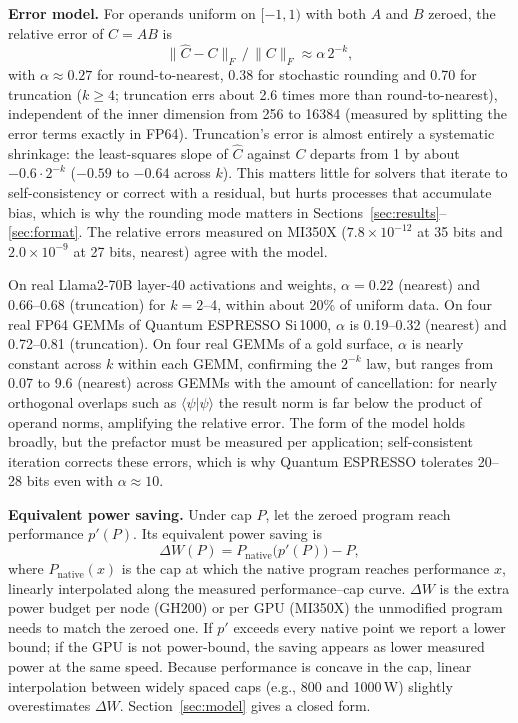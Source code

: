 \documentclass[conference]{IEEEtran}
\newcommand{\W}{\,W}
\newcommand{\ee}[2]{#1{\times}10^{#2}}  %
\newcommand{\pct}{\%}
\begin{document}
\textbf{Error model.} For operands uniform on $[-1,1)$ with both $A$ and $B$ zeroed, the relative error of $C=AB$ is
\begin{equation}
\lVert \hat C - C\rVert_F \,/\, \lVert C\rVert_F \approx \alpha\,2^{-k},
\end{equation}
with $\alpha\approx0.27$ for round-to-nearest, 0.38 for stochastic rounding and 0.70 for truncation ($k\ge4$;
truncation errs about 2.6 times more than round-to-nearest), independent of the inner dimension from 256 to 16384
(measured by splitting the error terms exactly in FP64). Truncation's error is almost entirely a systematic
shrinkage: the least-squares slope of $\hat C$ against $C$
departs from 1 by about $-0.6\cdot 2^{-k}$ ($-0.59$ to $-0.64$ across $k$). This matters little for solvers that
iterate to self-consistency or correct with a residual, but hurts processes that accumulate bias, which is why the
rounding mode matters in Sections~\ref{sec:results}--\ref{sec:format}. The relative errors measured on MI350X
($\ee{7.8}{-12}$ at 35 bits and $\ee{2.0}{-9}$ at 27 bits, nearest) agree with the model.

On real Llama2-70B layer-40 activations and weights, $\alpha=0.22$ (nearest) and 0.66--0.68 (truncation) for
$k=2$--4, within about 20\pct{} of uniform data. On four real FP64 GEMMs of Quantum ESPRESSO Si\,1000, $\alpha$ is
0.19--0.32 (nearest) and 0.72--0.81 (truncation). On four real GEMMs of a gold surface, $\alpha$ is nearly constant
across $k$ within each GEMM, confirming the $2^{-k}$ law, but ranges from 0.07 to 9.6 (nearest) across GEMMs
with the amount of cancellation: for nearly orthogonal overlaps such as $\langle\psi|\psi\rangle$ the result norm is
far below the product of operand norms, amplifying the relative error. The form of the model holds broadly, but the
prefactor must be measured per application; self-consistent iteration corrects these errors, which is why Quantum
ESPRESSO tolerates 20--28 bits even with $\alpha\approx 10$.

\textbf{Equivalent power saving.} Under cap $P$, let the zeroed program reach performance $p'(P)$. Its equivalent
power saving is
\begin{equation}
\Delta W(P) = P_\mathrm{native}\bigl(p'(P)\bigr) - P,
\end{equation}
where $P_\mathrm{native}(x)$ is the cap at which the native program reaches performance $x$, linearly interpolated
along the measured performance--cap curve. $\Delta W$ is the extra power budget per node (GH200) or per GPU (MI350X)
the unmodified program needs to match the zeroed one. If $p'$ exceeds every native point we report a lower bound; if
the GPU is not power-bound, the saving appears as lower measured power at the same speed. Because performance is
concave in the cap, linear interpolation between widely spaced caps (e.g., 800 and 1000\W) slightly overestimates
$\Delta W$. Section~\ref{sec:model} gives a closed form.
\end{document}
